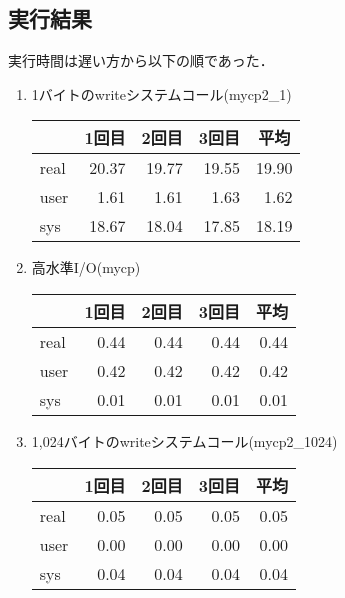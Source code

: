 \documentclass[a4j,twcolumn,11pt,nomag]{ltjarticle}      %
\begin{document}
\subsection*{実行結果}
実行時間は遅い方から以下の順であった．
\begin{enumerate}
\item 1バイトのwriteシステムコール(mycp2\_1)
  \begin{center}
    \begin{tabular}{|l | r | r | r | r |} \hline
      & \multicolumn{1}{|c|}{1回目}
      & \multicolumn{1}{|c|}{2回目}
      & \multicolumn{1}{|c|}{3回目}
      & \multicolumn{1}{|c|}{平均} \\\hline\hline
      real & 20.37 & 19.77 & 19.55 & 19.90 \\\hline
      user &  1.61 &  1.61 &  1.63 &  1.62 \\\hline
      sys  & 18.67 & 18.04 & 17.85 & 18.19 \\\hline
    \end{tabular}
  \end{center}
\item 高水準I/O(mycp)
  \begin{center}
    \begin{tabular}{|l | r | r | r | r |} \hline
      & \multicolumn{1}{|c|}{1回目}
      & \multicolumn{1}{|c|}{2回目}
      & \multicolumn{1}{|c|}{3回目}
      & \multicolumn{1}{|c|}{平均} \\\hline\hline
      real &  0.44 &  0.44 &  0.44 &  0.44 \\\hline
      user &  0.42 &  0.42 &  0.42 &  0.42 \\\hline
      sys  &  0.01 &  0.01 &  0.01 &  0.01 \\\hline
    \end{tabular}
  \end{center}
\item 1,024バイトのwriteシステムコール(mycp2\_1024)
  \begin{center}
    \begin{tabular}{|l | r | r | r | r |} \hline
      & \multicolumn{1}{|c|}{1回目}
      & \multicolumn{1}{|c|}{2回目}
      & \multicolumn{1}{|c|}{3回目}
      & \multicolumn{1}{|c|}{平均} \\\hline\hline
      real &  0.05 &  0.05 &  0.05 &  0.05 \\\hline
      user &  0.00 &  0.00 &  0.00 &  0.00 \\\hline
      sys  &  0.04 &  0.04 &  0.04 &  0.04 \\\hline
    \end{tabular}
  \end{center}
\end{enumerate}
\end{document}

